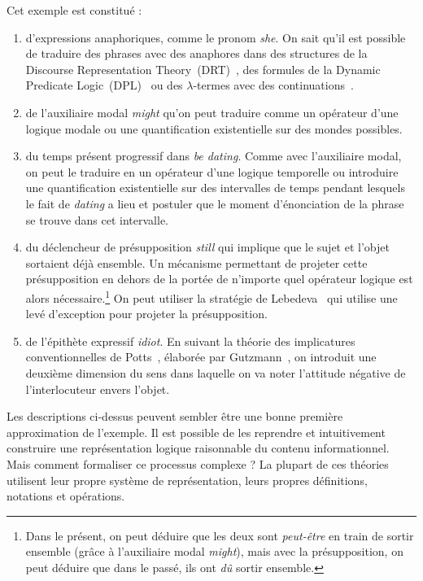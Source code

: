 Cet exemple est constitué :
\begin{enumerate}
  \item \label{item:french-first-feature} d'expressions anaphoriques, comme
    le pronom \emph{she}. On sait qu'il est possible de traduire des phrases avec des anaphores
    dans des structures de la Discourse Representation
    Theory~(DRT)~\cite{kamp1993discourse}, des formules de la Dynamic Predicate
    Logic~(DPL)~\cite{groenendijk1991dynamic} ou des $\lambda$-termes avec des
     continuations~\cite{de2006towards}.
  \item de l'auxiliaire modal \emph{might} qu'on peut traduire comme un
    opérateur d'une logique modale ou une quantification existentielle sur des
    mondes possibles.
  \item du temps présent progressif dans \emph{be dating}. Comme avec
    l'auxiliaire modal, on peut le traduire en un opérateur d'une logique
    temporelle ou introduire une quantification existentielle sur des
    intervalles de temps pendant lesquels le fait de \emph{dating} a lieu et postuler
    que le moment d'énonciation de la phrase se trouve dans cet intervalle.
  \item du déclencheur de présupposition \emph{still} qui implique que le sujet
    et l'objet sortaient déjà ensemble. Un mécanisme permettant de projeter
    cette présupposition en dehors de la portée de n'importe quel opérateur
    logique est alors nécessaire.\footnote{Dans le présent, on peut déduire que
      les deux sont \emph{peut-être} en train de sortir ensemble (grâce à
      l'auxiliaire modal \emph{might}), mais avec la présupposition, on peut
      déduire que dans le passé, ils ont \emph{dû} sortir ensemble.} On peut
    utiliser la stratégie de Lebedeva~\cite{lebedeva2012expression} qui utilise
    une levé d'exception pour projeter la présupposition.
  \item \label{item:french-last-feature} de l'épithète expressif \emph{idiot}.
    En suivant la théorie des implicatures conventionnelles de
    Potts~\cite{potts2005logic}, élaborée par Gutzmann~\cite{gutzmann2015use},
    on introduit une deuxième dimension du sens dans laquelle on va noter
    l'attitude négative de l'interlocuteur envers l'objet.
\end{enumerate}

Les descriptions ci-dessus peuvent sembler être une bonne première approximation de 
l'exemple. Il est possible de les reprendre et intuitivement construire une représentation 
logique raisonnable du contenu informationnel. Mais comment formaliser ce processus 
complexe ? La plupart de ces théories utilisent leur propre système de représentation, leurs propres
définitions, notations et opérations.

